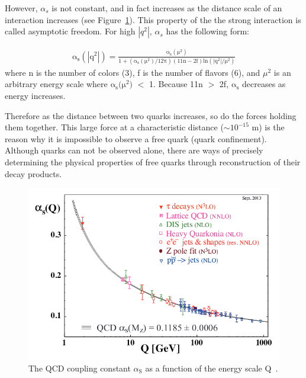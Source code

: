 However, $\alpha_s$ is not constant, and in fact increases as the distance scale of an interaction increases (see Figure~\ref{figs:alphasrunning}).  
This property of the the strong interaction is called asymptotic freedom.  For high $|q^2|$, $\alpha_s$ has the following form:

\begin{eqnarray}
\mathrm{\alpha_{s}(|q^2|)} =  \frac{\mathrm{\alpha_{s}(\mu^{2})}}{\mathrm{1+(\alpha_{s}(\mu^{2})/12\pi)(11n-2f)ln(|q^2|/\mu^{2})}}
\label{eqn:qcdalphas}
\end{eqnarray}  
where n is the number of colors (3), f is the number of flavors (6), and $\mu^{2}$ is an arbitrary energy scale where $\mathrm{\alpha_{s}(\mu^{2}})$ $<$ 1.
Because 11n $>$ 2f, $\mathrm{\alpha_{s}}$ decreases as energy increases.


Therefore as the distance between two quarks increases, so do the forces holding them together.  
This large force at a characteristic distance ($\sim10^{-15}$ m) is the reason why it is impossible to observe a free quark (quark confinement).  
Although quarks can not be observed alone, there are ways of precisely determining the physical properties of free quarks through reconstruction of their decay products.  




\begin{figure}
\begin{center}
\includegraphics[width=1.0\linewidth]{figs/alphasrunning.png}
\caption{The QCD coupling constant $\alpha_{\mathrm{S}}$ as a function of the energy scale Q~\cite{PDG-2014}.}
\label{figs:alphasrunning}
\end{center}
\end{figure}


